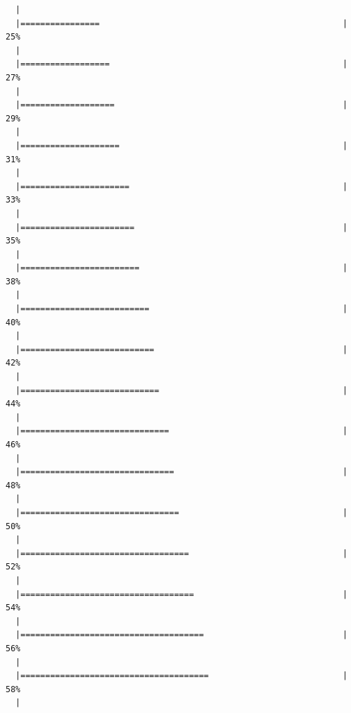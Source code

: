 \documentclass[]{book}
\begin{document}
\begin{verbatim}
  |                                                                       
  |================                                                 |  25%
  |                                                                       
  |==================                                               |  27%
  |                                                                       
  |===================                                              |  29%
  |                                                                       
  |====================                                             |  31%
  |                                                                       
  |======================                                           |  33%
  |                                                                       
  |=======================                                          |  35%
  |                                                                       
  |========================                                         |  38%
  |                                                                       
  |==========================                                       |  40%
  |                                                                       
  |===========================                                      |  42%
  |                                                                       
  |============================                                     |  44%
  |                                                                       
  |==============================                                   |  46%
  |                                                                       
  |===============================                                  |  48%
  |                                                                       
  |================================                                 |  50%
  |                                                                       
  |==================================                               |  52%
  |                                                                       
  |===================================                              |  54%
  |                                                                       
  |=====================================                            |  56%
  |                                                                       
  |======================================                           |  58%
  |                                                                       

\end{verbatim}
\end{document}
